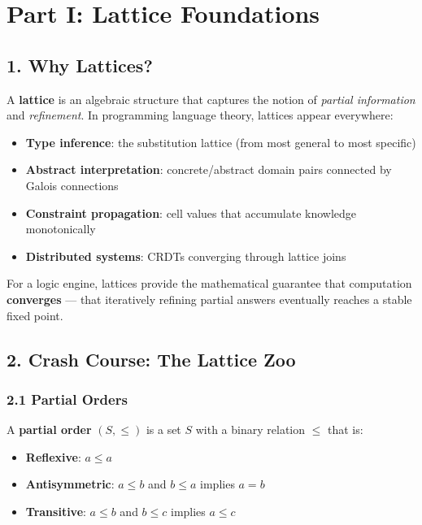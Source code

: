 \documentclass[11pt]{article}
\begin{document}
\section{Part I: Lattice Foundations}
\label{sec:org1d4a47e}

\subsection{1. Why Lattices?}
\label{sec:org496ff82}

A \textbf{lattice} is an algebraic structure that captures the notion of
\emph{partial information} and \emph{refinement}. In programming language theory,
lattices appear everywhere:

\begin{itemize}
\item \textbf{Type inference}: the substitution lattice (from most general to most specific)
\item \textbf{Abstract interpretation}: concrete/abstract domain pairs connected by Galois connections
\item \textbf{Constraint propagation}: cell values that accumulate knowledge monotonically
\item \textbf{Distributed systems}: CRDTs converging through lattice joins
\end{itemize}

For a logic engine, lattices provide the mathematical guarantee that
computation \textbf{converges} --- that iteratively refining partial answers
eventually reaches a stable fixed point.
\subsection{2. Crash Course: The Lattice Zoo}
\label{sec:org7910986}

\subsubsection{2.1 Partial Orders}
\label{sec:org92c7757}

A \textbf{partial order} \((S, \leq)\) is a set \(S\) with a binary relation \(\leq\) that is:

\begin{itemize}
\item \textbf{Reflexive}: \(a \leq a\)
\item \textbf{Antisymmetric}: \(a \leq b\) and \(b \leq a\) implies \(a = b\)
\item \textbf{Transitive}: \(a \leq b\) and \(b \leq c\) implies \(a \leq c\)
\end{itemize}
\end{document}
